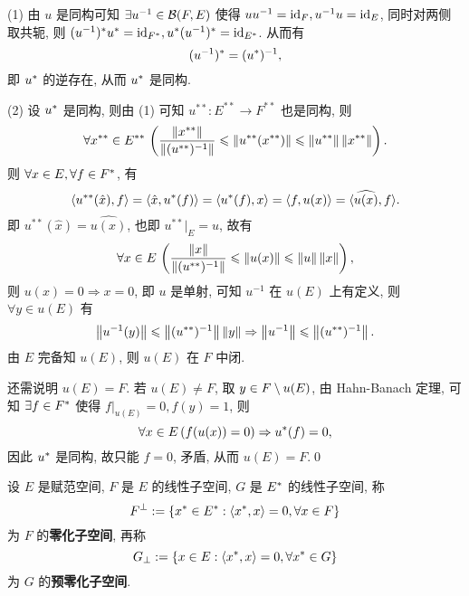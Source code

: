     \begin{Proof}
        (1) 由 $ u $ 是同构可知 $ \exists u^{-1}\in\mathcal{B}(F, E) $ 使得 $ uu^{-1}=\mathrm{id}_{F}, u^{-1}u=\mathrm{id}_{E} $, 同时对两侧取共轭, 则 $ (u^{-1})^{*}u^{*}=\mathrm{id}_{F^{*}},u^{*}(u^{-1})^{*}=\mathrm{id}_{E^{*}}  $. 从而有
        \[
            (u^{-1})^{*}=(u^{*})^{-1},
        \]
        即 $ u^{*} $ 的逆存在, 从而 $ u^{*} $ 是同构.

        (2) 设 $ u^{*} $ 是同构, 则由 (1) 可知 $ u^{**}: E^{**}\to F^{**} $ 也是同构, 则
        \[
            \forall x^{**}\in E^{**}\,\left(\frac{\left\| x^{**} \right\|}{\left\| (u^{**})^{-1} \right\|}\leqslant\left\| u^{**}(x^{**}) \right\|\leqslant\left\| u^{**} \right\|\left\| x^{**} \right\|\right).
        \]
        则 $ \forall x\in E, \forall f\in F^{*} $, 有
        \[
            \left\langle u^{**}(\hat{x}), f \right\rangle=\left\langle \hat{x}, u^{*}(f) \right\rangle=\left\langle u^{*}(f), x \right\rangle=\left\langle f, u(x) \right\rangle=\langle\widehat{u(x)}, f\rangle.
        \]
        即 $ u^{**}(\hat{x})=\widehat{u(x)} $, 也即 $ u^{**}|_{E}=u $, 故有
        \[
            \forall x\in E\,\left( \frac{\left\| x \right\|}{\left\| (u^{**})^{-1} \right\|}\leqslant\left\| u(x) \right\|\leqslant\left\| u \right\|\left\| x \right\| \right),
        \]
        则 $ u(x)=0\Longrightarrow x=0 $, 即 $ u $ 是单射, 可知 $ u^{-1} $ 在 $ u(E) $ 上有定义, 则 $ \forall y\in u(E) $ 有
        \[
            \left\| u^{-1}(y) \right\|\leqslant\left\| (u^{**})^{-1} \right\|\left\| y \right\|\Rightarrow \left\| u^{-1} \right\|\leqslant\left\| (u^{**})^{-1} \right\|.
        \]
        由 $ E $ 完备知 $ u(E) $, 则 $ u(E) $ 在 $ F $ 中闭.

        还需说明 $ u(E)=F $. 若 $ u(E)\ne F $, 取 $ y\in F\setminus u(E) $, 由 Hahn-Banach 定理, 可知 $ \exists f\in F^{*} $ 使得 $ f|_{u(E)}=0, f(y)=1 $, 则
        \[
            \forall x\in E\,(f(u(x))=0)\Rightarrow u^{*}(f)=0,
        \]
        因此 $ u^{*} $ 是同构, 故只能 $ f=0 $, 矛盾, 从而 $ u(E)=F $.\qed
    \end{Proof}

    \begin{Definition}\label{def:零化子空间}
        设 $ E $ 是赋范空间, $ F $ 是 $ E $ 的线性子空间, $ G $ 是 $ E^{*} $ 的线性子空间, 称
        \[
            F^{\bot}:=\{ x^{*}\in E^{*}:\left\langle x^{*}, x \right\rangle=0, \forall x\in F \}
        \]    
        为 $ F $ 的\textbf{零化子空间}, 再称
        \[
            G_{\bot}:=\{ x\in E:\left\langle x^{*}, x \right\rangle=0, \forall x^{*}\in G \}
        \]
        为 $ G $ 的\textbf{预零化子空间}.
    \end{Definition}

